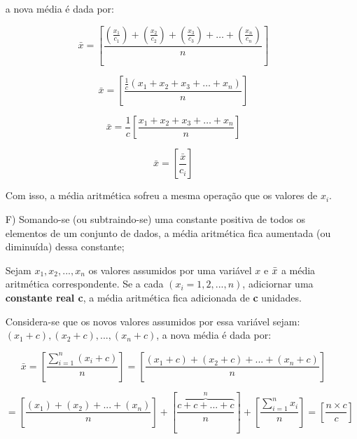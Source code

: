 \begin{enumerate}
a nova média é dada por:

\begin{equation*}\label{media3}
     \bar{x} = \left[ \frac{\left( \frac{x_{1}}{c_{1}} \right)+ \left( \frac{x_{2}}{c_{2}} \right)+ \left( \frac{x_{3}}{c_{3}}\right)+\ldots+\left( \frac{x_{n}}{c_{n}} \right)}{n} \right]
\end{equation*}

\begin{equation*}\label{media3}
     \bar{x}= \left[ \frac{ \frac{1}{c} \left( x_{1}+x_{2}+x_{3}+\ldots+x_{n} \right)}{n} \right]
\end{equation*}

\begin{equation*}\label{media3}
     \bar{x}= \frac{1}{c} \left[ \frac{x_{1}+x_{2}+x_{3}+\ldots+x_{n}}{n} \right]
\end{equation*}

\begin{equation*}\label{media3}
     \bar{x}= \left[ \frac{\bar{x}}{c_{i}} \right]
\end{equation*}

Com isso, a média aritmética sofreu a mesma operação que os valores de $x_{i}$.

\item [{F)}] Somando-se (ou subtraindo-se) uma constante positiva de todos os elementos de um conjunto de dados, a média aritmética fica aumentada (ou diminuída) dessa constante;

\newpage
\textbf{} 
\vskip0.3cm

Sejam $x_{1}, x_{2},...,x_{n}$ os valores assumidos por uma variável $x$ e $\Bar{x}$ a média aritmética correspondente. Se a cada $(x_{i}=1,2,...,n)$, adiciornar uma \textbf{constante real c}, a média aritmética fica adicionada de \textbf{c} unidades.\vskip0.3cm

Considera-se que os novos valores assumidos por essa variável sejam: $(x_{1}+c),(x_{2}+c),...,(x_{n}+c)$, a nova média é dada por:

\begin{equation*}\label{media3}
     \bar{x} = \left[ \frac{\sum_{i=1}^{n}(x_{i}+c)}{n} \right] =  \left[  \frac{(x_{1}+c)+(x_{2}+c)+...+(x_{n}+c)}{n} \right]
\end{equation*}

\begin{equation*}\label{media4}
  = \left[ \frac{(x_{1})+(x_{2})+...+(x_{n})}{n} \right] +  \left[ \overbrace{\frac{c+c+...+c}{n}}^{n} \right]+ 
 \left[ \frac{\sum_{i=1}^{n}x_{i}}{n}\right] = \left[ \frac{n \times c}{c} \right]
\end{equation*}


\end{enumerate}
